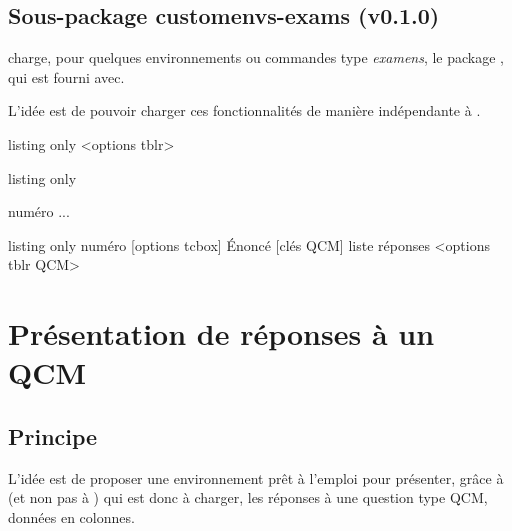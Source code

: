 \documentclass[french,11pt,a4paper]{article}
\begin{document}
\subsection{Sous-package customenvs-exams (v0.1.0)}

 charge, pour quelques environnements ou commandes type \textit{examens}, le package , qui est fourni avec.

L'idée est de pouvoir charger ces fonctionnalités de manière indépendante à .

\begin{DemoCode}{listing only}
%
  <options tblr>
\end{DemoCode}

\begin{DemoCode}{listing only}
\begin{ExamAutomatQuest}{numéro}
...
\end{ExamAutomatQuest}
\end{DemoCode}

\begin{DemoCode}{listing only}
\QuestionAutomatismes%
	{numéro}%
	[options tcbox]%
	{Énoncé}%
	[clés QCM]%
	{liste réponses}%
	<options tblr QCM>%
\end{DemoCode}

\newpage

\section{Présentation de réponses à un QCM}

\subsection{Principe}

L'idée est de proposer une environnement prêt à l'emploi pour présenter, grâce à  (et non pas à ) qui est donc à charger, les réponses à une question type QCM, données en colonnes.
\end{document}
